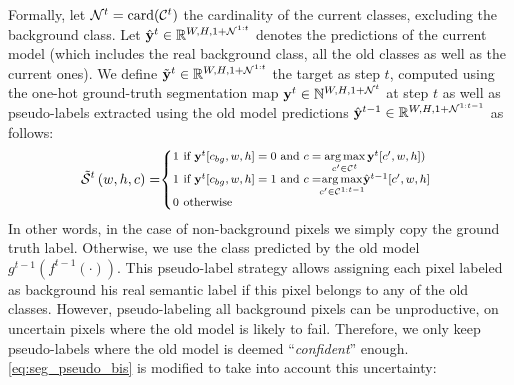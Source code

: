 Formally, let $\mathcal{N}^t=\operatorname{card}(\mathcal{C}^{t})$ the cardinality of the current classes,
excluding the background class. Let $\hat{\mathbf{y}}^{t} \in \mathbb{R}^{W,H,1+\mathcal{N}^{1:t}}$ denotes the
predictions of the current model (which includes the real background class, all the old classes as
well as the current ones). We define $\tilde{\mathbf{y}}^{t} \in \mathbb{R}^{W,H,1+\mathcal{N}^{1:t}}$ the target
as step $t$, computed using the one-hot ground-truth segmentation map $\mathbf{y}^{t} \in
    \mathbb{N}^{W,H,1+\mathcal{N}^t}$ at step $t$ as well as pseudo-labels extracted using the old model
predictions $\hat{\mathbf{y}}^{t-1} \in \mathbb{R}^{W,H,1+\mathcal{N}^{1:t-1}}$ as follows:
%
\begin{equation}
    \footnotesize
    \tilde \mcS^{t}\left(w,h,c\right)= \mkern-5mu \left\{\begin{array}{ll}
        \mkern-10mu 1 \mkern-27mu & \text { if } \vy^{t} [c_{bg},w,h]=0 \text { and } c = \argmax \limits_{c' \in \mcC^{t}} \vy^{t}[c',w,h])                                 \\
        \mkern-10mu 1 \mkern-27mu & \text { if } \vy^{t}[c_{bg},w,h]=1 \text { and } c = \mkern-8mu \argmax \limits_{c' \in \mcC^{1:t-1}} \mkern-6mu \hat{\vy}^{t-1}[c',w,h] \\
        \mkern-10mu 0 \mkern-27mu & \text { otherwise }                                                                                                                      \\
    \end{array}\right.
    \label{eq:seg_pseudo_bis}
\end{equation}
%
In other words, in the case of non-background pixels we simply copy the ground truth label.
Otherwise, we use the class predicted by the old model $g^{t-1}(f^{t-1}(\cdot))$. This pseudo-label
strategy allows assigning each pixel labeled as background his real semantic label if this pixel
belongs to any of the old classes. However, pseudo-labeling all background pixels can be
unproductive, \eg on uncertain pixels where the old model is likely to fail. Therefore, we only keep
pseudo-labels where the old model is deemed ``\textit{confident}'' enough.
\autoref{eq:seg_pseudo_bis} is modified to take into account this uncertainty:
%
